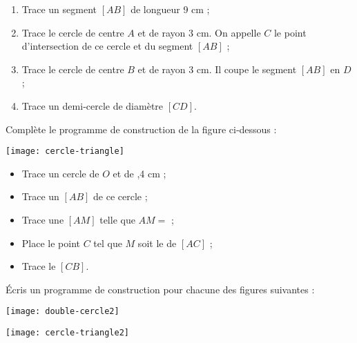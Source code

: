 \begin{exercice}
\begin{enumerate}
 \item Trace un segment $[AB]$ de longueur 9 cm ;
 \item Trace le cercle de centre $A$ et de rayon 3 cm. On appelle $C$ le point d'intersection de ce cercle et du segment $[AB]$ ;
 \item Trace le cercle de centre $B$ et de rayon 3 cm. Il coupe le segment $[AB]$ en $D$ ;
 \item Trace un demi‑cercle de diamètre $[CD]$.
 \end{enumerate}
\end{exercice}


\begin{exercice}
Complète le programme de construction de la figure ci‑dessous :
\begin{center}  \texttt{[image: cercle-triangle]} \end{center}
\begin{itemize}
 \item Trace un cercle de \dotfill $O$ et de ,4 cm ;
\vspace{.4em}
 \item Trace un \dotfill $[AB]$ de ce cercle ;
\vspace{.4em}
 \item Trace une \dotfill $[AM]$ telle que $AM =$  \dotfill ;
\vspace{.4em}
 \item Place le point $C$ tel que $M$ soit le  \dotfill de $[AC]$ ;
\vspace{.4em}
 \item Trace le  \dotfill $[CB]$.
 \end{itemize}
\end{exercice}


\begin{exercice}
Écris un programme de construction pour chacune des figures suivantes :

\begin{colenumerate}{1}
 \item 
 \begin{center}
 \texttt{[image: double-cercle2]}
 \end{center}
 \item 
\begin{center}
\texttt{[image: cercle-triangle2]}
\end{center}
 \end{colenumerate}
\end{exercice}







